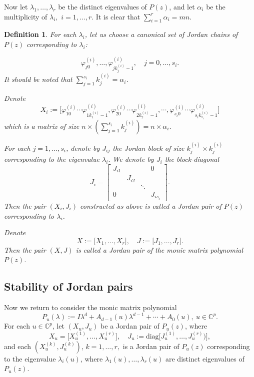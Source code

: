 \documentclass[10pt,reqno]{amsart}
\theoremstyle{break-italic}
\theoremstyle{break-italic}
\theoremstyle{break-italic}
\theoremstyle{break-italic}
\theoremstyle{break-italic}
\theoremstyle{break-italic}
\theoremstyle{break-italic}
\theoremstyle{break-italic}
\theoremstyle{break-roman}
\newtheorem{definition}[satz]{Definition}
\theoremstyle{standard}
\theoremstyle{varthm-roman}
\theoremstyle{varthm-italic}
\theoremstyle{varthm-roman-break}
\theoremstyle{varthm-italic-break}
\theoremstyle{varthm-roman-no-punctuation}
\theoremstyle{varthm-italic-no-punctuation}
\numberwithin{equation}{section}
\begin{document}
Now let $\lambda_1, \ldots, \lambda_r$  be the distinct eigenvalues of $P(z)$, and let $\alpha_i$ be the multiplicity of $\lambda_i,$ $i=1, \ldots, r$. It is clear that $\displaystyle\sum_{i=1}^r \alpha_i=mn$.
\begin{definition} \rm For each $\lambda_i$, let us choose a canonical set of Jordan chains of $P(z)$ corresponding to $\lambda_i$:

$$\varphi_{j0}^{(i)}, \ldots, \varphi_{j k_j^{(i)}-1}^{(i)}, \quad j=0, \ldots,s_i. $$
It should be noted that $\displaystyle\sum_{j=1}^{s_i} k_j^{(i)} = \alpha_i$.

Denote
$$X_i:=\big[\varphi_{10}^{(i)}  \cdots \varphi_{1 k_1^{(i)}-1}^{(i)}, \varphi_{20}^{(i)}  \cdots \varphi_{2 k_2^{(i)}-1}^{(i)}, \cdots, \varphi_{s_i 0}^{(i)}  \cdots \varphi_{s_i k_{s_i}^{(i)}-1}^{(i)}\big] $$
which is a matrix of size $n\times \left(\sum_{j=1}^{s_i} k_j^{(i)}\right) = n\times \alpha_i$.

For each $j=1, \ldots, s_i$, denote by $J_{ij}$ the Jordan block of size $k_j^{(i)} \times k_j^{(i)}$ corresponding to the eigenvalue $\lambda_i.$ We denote by $J_i$ the block-diagonal
$$ J_i=\left[\begin{array}{cccc}
J_{i1} & & & 0\\
       &J_{i2}& & \\
       & & \ddots & \\
   0   & & & J_{is_i}
\end{array}\right]. $$
Then the pair $(X_i,J_i)$ constructed as above is called a {\em Jordan pair of $P(z)$ corresponding to $\lambda_i$}.

Denote
$$X:=\big[X_1, \ldots, X_r \big], \quad J:=\big[J_1,\ldots, J_r\big]. $$
Then the pair $(X,J)$ is called a {\em Jordan pair} of the monic matrix polynomial $P(z)$.
\end{definition}

\subsection{Stability of Jordan pairs}

Now we return to consider the monic matrix polynomial
 $$P_{u}(\lambda) := I \lambda^d  + A_{d - 1}(u) \lambda^{d - 1}  + \cdots + A_{0}(u), ~ u \in \mathbb C^p.$$
For each $u \in \mathbb{C}^p$, let  $(X_u, J_u)$ be a Jordan pair of  $P_u(z)$, where
$$ X_u=\big[X_u^{(1)}, \ldots, X_u^{(r)}\big], \quad J_u := \mathrm{diag}\big[J_u^{(1)}, \ldots, J_u^{(r)})\big],$$
and each $(X_u^{(k)}, J_u^{(k)})$, $k = 1, \ldots, r,$ is a Jordan pair of $P_u(z)$ corresponding to the eigenvalue $\lambda_i(u)$, where $\lambda_1(u), \ldots, \lambda_r(u)$ are distinct eigenvalues of $P_u(z).$
\end{document}
